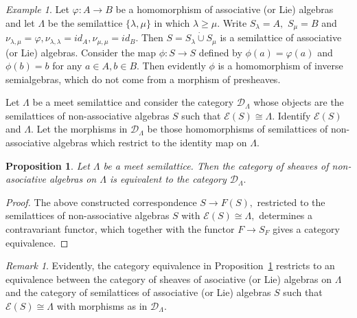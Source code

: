 \documentclass[10pt,a4paper]{amsart}
\newtheorem{prop}[thm]{Proposition}
\theoremstyle{definition}
\theoremstyle{remark}
\newtheorem{rem}[thm]{Remark}
\newtheorem{ex}[thm]{Example}
\numberwithin{equation}{section}
\newtheorem*{Theorem A}{\textbf{Theorem A}}
\newtheorem*{Corollary E}{\textbf{Corollary E}}
\newtheorem*{Corollary F}{\textbf{Corollary F}}
\newtheorem*{Theorem B}{\textbf{Theorem B}}
\newtheorem*{Theorem C}{\textbf{Theorem C}}
\newtheorem*{Theorem D}{\textbf{Theorem B}}
\newtheorem*{p a}{\textbf{Proof of  Theorem A}}
\newtheorem*{p b}{\textbf{Proof of Theorem B}}
\newtheorem*{p c}{\textbf{Proof of  Theorem C}}
\newtheorem*{p d}{\textbf{Proof of  Theorem D}}
\newcommand{\E}{\mathcal{E}}
\newcommand{\0}{{\vartheta}}
\begin{document}
\begin{ex} Let $\varphi : A \to B$ be a homomorphism of associative (or Lie) algebras and let $\Lambda $ be the semilattice 
$\{ \lambda, \mu \} $ in which  $ \lambda \geq \mu  $. Write $S_{\lambda} = A,$  $S_{\mu} = B$ and
$\nu _{\lambda, \mu} = \varphi ,  \nu _{\lambda, \lambda } = id _A, \nu _{\mu, \mu} = id _B.$ Then
$S= S_{\lambda} \dot{\cup} S_{\mu}$  is a semilattice of  associative (or Lie) algebras. Consider the map 
$\phi : S \to S$ defined by $\phi (a) = \varphi (a)$ and
$\phi (b) =b$  for any $a\in A, b\in B$. Then evidently
$\phi$ is a homomorphism of inverse semialgebras, which do not come from a morphism of presheaves.
 \end{ex}
 
 Let $\Lambda $ be a meet semilattice and consider the  category   $\mathcal D _{\Lambda}$  whose objects are the semilattices of non-associative algebras $S$ such that $\E (S) \cong \Lambda $. Identify  $\E (S)$ and $\Lambda $. Let the morphisms in $\mathcal D _{\Lambda}$  be those  homomorphisms of  semilattices of non-associative  algebras which restrict to the identity map on $\Lambda $.
 
 
 

\begin{prop}\label{prop:CategoryEquiv} Let $\Lambda $ be a meet semilattice.
    Then the category of sheaves of non-asociative algebras on $\Lambda $  is equivalent to the category
    $\mathcal D _{\Lambda}.$
\end{prop}
\begin{proof} The above constructed correspondence $S\to F(S),$ restricted to the
semilattices of non-associative algebras $S$ with $\E (S) \cong \Lambda ,$ determines a contravariant functor, which  together with the functor  $F\to S_F$  gives a category equivalence.
\end{proof}

\begin{rem} Evidently, the category equivalence in Proposition~\ref{prop:CategoryEquiv} restricts to an equivalence between the category of sheaves of asociative
    (or Lie)  algebras on $\Lambda $  and the category of semilattices of associative (or Lie) algebras $S$ such that $\E (S) \cong \Lambda $ with morphisms as in $\mathcal D _{\Lambda}.$ 
\end{rem}
\end{document}
